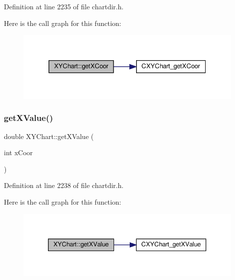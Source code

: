 Definition at line 2235 of file chartdir.\+h.

Here is the call graph for this function\+:
\nopagebreak
\begin{figure}[H]
\begin{center}
\leavevmode
\includegraphics[width=325pt]{class_x_y_chart_af5f0a34609220660b81835c11a395286_cgraph}
\end{center}
\end{figure}
\mbox{\label{class_x_y_chart_a09ad6299504a44dcccac5951af31312f}} 
\subsubsection{\texorpdfstring{get\+X\+Value()}{getXValue()}}
{\footnotesize\ttfamily double X\+Y\+Chart\+::get\+X\+Value (\begin{DoxyParamCaption}\item[{int}]{x\+Coor }\end{DoxyParamCaption})\hspace{0.3cm}{\ttfamily [inline]}}



Definition at line 2238 of file chartdir.\+h.

Here is the call graph for this function\+:
\nopagebreak
\begin{figure}[H]
\begin{center}
\leavevmode
\includegraphics[width=333pt]{class_x_y_chart_a09ad6299504a44dcccac5951af31312f_cgraph}
\end{center}
\end{figure}
\mbox{\label{class_x_y_chart_a416792e0d3b2a29fcc5c918948581509}} 
